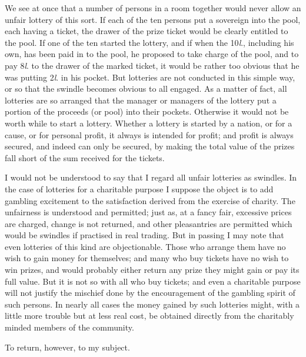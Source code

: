 \documentclass[letterpaper,12pt,oneside,openany]{memoir}
\begin{document}
We see at once that a number of persons in a room
together would never allow an unfair lottery of this sort.
If each of the ten persons put a sovereign into the pool,
each having a ticket, the drawer of the prize ticket
would be clearly entitled to the pool. If one of the ten
started the lottery, and if when the 10\textit{l}., including his
own, has been paid in to the pool, he proposed to take
charge of the pool, and to pay 8\textit{l}. to the drawer of the
marked ticket, it would be rather too obvious that he
was putting 2\textit{l}. in his pocket. But lotteries are not
conducted in this simple way, or so that the swindle
becomes obvious to all engaged. As a matter of fact,
all lotteries are so arranged that the manager or managers
of the lottery put a portion of the proceeds (or pool)
into their pockets. Otherwise it would not be worth
while to start a lottery. Whether a lottery is started
by a nation, or for a cause, or for personal profit, it
always is intended for profit; and profit is always
secured, and indeed can only be secured, by making
the total value of the prizes fall short of the sum received
for the tickets.

I would not be understood to say that I regard all
unfair lotteries as swindles. In the case of lotteries for
a charitable purpose I suppose the object is to add
gambling excitement to the satisfaction derived from
the exercise of charity. The unfairness is understood
and permitted; just as, at a fancy fair, excessive prices
are charged, change is not returned, and other pleasantries
are permitted which would be swindles if practised in
real trading. But in passing I may note that even
lotteries of this kind are objectionable. Those who
arrange them have no wish to gain money for themselves;
and many who buy tickets have no wish to win
prizes, and would probably either return any prize they
might gain or pay its full value. But it is not so with
all who buy tickets; and even a charitable purpose will
not justify the mischief done by the encouragement of
the gambling spirit of such persons. In nearly all cases
the money gained by such lotteries might, with a little
more trouble but at less real cost, be obtained directly
from the charitably minded members of the community.

To return, however, to my subject.
\end{document}
